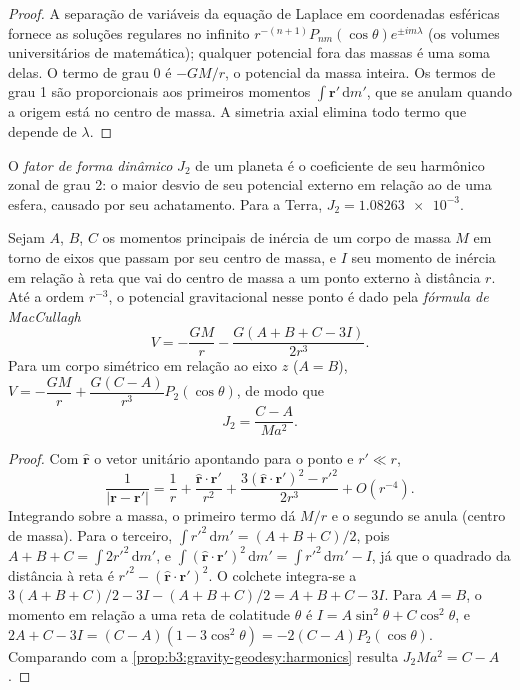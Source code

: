\begin{proof}
A separação de variáveis da equação de Laplace em coordenadas esféricas
fornece as soluções regulares no infinito $r^{-(n+1)}P_{nm}(\cos\theta)e^{\pm
im\lambda}$ (os volumes universitários de matemática); qualquer potencial fora das
massas é uma soma delas. O termo de grau 0 é $-GM/r$, o potencial da massa
inteira. Os termos de grau 1 são proporcionais aos primeiros momentos
$\int\mathbf r'\,\mathrm dm'$, que se anulam quando a origem está no centro de
massa. A simetria axial elimina todo termo que depende de $\lambda$.
\end{proof}

\begin{definition}\label{def:b3:gravity-geodesy:j2}
O \emph{fator de forma dinâmico} $J_2$ de um planeta
é o coeficiente de seu harmônico zonal de grau 2: o maior desvio de seu
potencial externo em relação ao de uma esfera, causado por seu achatamento. Para a
Terra, $J_2 = \num{1.08263e-3}$.
\end{definition}

\begin{theorem}\label{thm:b3:gravity-geodesy:maccullagh}
Sejam $A$, $B$, $C$ os momentos principais de inércia de um corpo de massa $M$
em torno de eixos que passam por seu centro de massa, e $I$ seu momento de inércia
em relação à reta que vai do centro de massa a um ponto externo à distância $r$. Até
a ordem $r^{-3}$, o potencial gravitacional nesse ponto é dado pela
\emph{fórmula de MacCullagh}
\[
  V = -\frac{GM}{r} - \frac{G(A + B + C - 3I)}{2r^3} .
\]
Para um corpo simétrico em relação ao eixo $z$ ($A = B$),
$V = -\dfrac{GM}{r} + \dfrac{G(C - A)}{r^3}P_2(\cos\theta)$, de modo que
\[
  J_2 = \frac{C - A}{Ma^2} .
\]
\end{theorem}

\begin{proof}
Com $\hat{\mathbf r}$ o vetor unitário apontando para o ponto e $r' \ll r$,
\[
  \frac{1}{|\mathbf r - \mathbf r'|} = \frac1r + \frac{\hat{\mathbf r}\cdot\mathbf r'}{r^2}
  + \frac{3(\hat{\mathbf r}\cdot\mathbf r')^2 - r'^2}{2r^3} + O(r^{-4}).
\]
Integrando sobre a massa, o primeiro termo dá $M/r$ e o segundo se anula
(centro de massa). Para o terceiro, $\int r'^2\,\mathrm dm' = (A + B + C)/2$, pois
$A + B + C = \int 2r'^2\,\mathrm dm'$, e $\int(\hat{\mathbf r}\cdot\mathbf
r')^2\,\mathrm dm' = \int r'^2\,\mathrm dm' - I$, já que o quadrado da distância à
reta é $r'^2 - (\hat{\mathbf r}\cdot\mathbf r')^2$. O colchete integra-se
a $3(A + B + C)/2 - 3I - (A + B + C)/2 = A + B + C - 3I$. Para $A = B$, o
momento em relação a uma reta de colatitude $\theta$ é $I = A\sin^2\theta + C\cos^2\theta$,
e $2A + C - 3I = (C - A)(1 - 3\cos^2\theta) = -2(C - A)P_2(\cos\theta)$.
Comparando com a \cref{prop:b3:gravity-geodesy:harmonics} resulta
$J_2Ma^2 = C - A$.
\end{proof}

